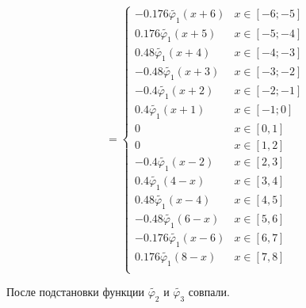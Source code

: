 \documentclass[a4paper, 12pt,fleqn]{extarticle}
\begin{document}
        \[
            =
            \begin{cases}
               -0.176 \tilde{\varphi_1}(x+6)&x\in[-6;-5]\\
               0.176 \tilde{\varphi_1}(x+5)&x\in[-5;-4]\\
               0.48 \tilde{\varphi_1}(x+4)&x\in[-4;-3] \\
               -0.48 \tilde{\varphi_1}(x+3)&x\in[-3;-2] \\
               -0.4 \tilde{\varphi_1}(x+2)&x\in[-2;-1]\\
               0.4 \tilde{\varphi_1}(x+1)&x\in[-1;0]\\
               0&x\in[0,1]\\
               0&x\in[1,2]\\
               -0.4 \tilde{\varphi_1}(x-2)&x\in[2,3]\\
               0.4 \tilde{\varphi_1}(4-x)&x\in[3,4]\\
               0.48 \tilde{\varphi_1}(x-4)&x\in[4,5] \\
               -0.48 \tilde{\varphi_1}(6-x)&x\in[5,6] \\
               -0.176 \tilde{\varphi_1}(x-6)&x\in[6,7]\\
               0.176 \tilde{\varphi_1}(8-x)&x\in[7,8]\\
            \end{cases}\]

        После подстановки функции $\tilde{\varphi_2}$ и $\tilde{\varphi_3}$ совпали.
        \newpage    
\end{document}
